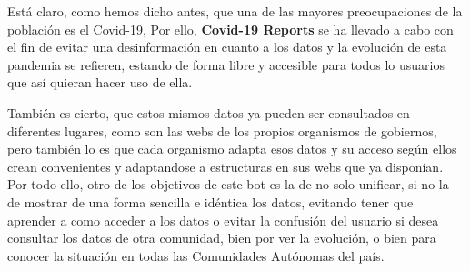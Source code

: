 Está claro, como hemos dicho antes, que una de las mayores preocupaciones de la población es el Covid-19, Por ello, \textbf{Covid-19 Reports} se ha llevado a cabo con el fin de evitar una desinformación en cuanto a los datos y la evolución de esta pandemia se refieren, estando de forma libre y accesible para todos lo usuarios que así quieran hacer uso de ella.

También es cierto, que estos mismos datos ya pueden ser consultados en diferentes lugares, como son las webs de los propios organismos de gobiernos, pero también lo es que cada organismo adapta esos datos y su acceso según ellos crean convenientes y adaptandose a estructuras en sus webs que ya disponían. Por todo ello, otro de los objetivos de este bot es la de no solo unificar, si no la de mostrar de una forma sencilla e idéntica los datos, evitando tener que aprender a como acceder a los datos o evitar la confusión del usuario si desea consultar los datos de otra comunidad, bien por ver la evolución, o bien para conocer la situación en todas las Comunidades Autónomas del país.